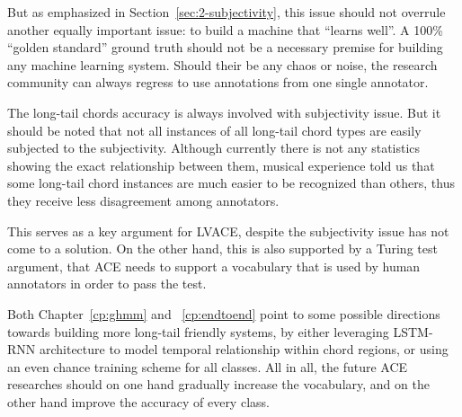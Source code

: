 But as emphasized in Section~\ref{sec:2-subjectivity}, this issue should not overrule another equally important issue: to build a machine that ``learns well''. A 100\% ``golden standard'' ground truth should not be a necessary premise for building any machine learning system. Should their be any chaos or noise, the research community can always regress to use annotations from one single annotator.

The long-tail chords accuracy is always involved with subjectivity issue. But it should be noted that not all instances of all long-tail chord types are easily subjected to the subjectivity. Although currently there is not any statistics showing the exact relationship between them, musical experience told us that some long-tail chord instances are much easier to be recognized than others, thus they receive less disagreement among annotators.

This serves as a key argument for LVACE, despite the subjectivity issue has not come to a solution. On the other hand, this is also supported by a Turing test argument, that ACE needs to support a vocabulary that is used by human annotators in order to pass the test.

Both Chapter~\ref{cp:ghmm} and ~\ref{cp:endtoend} point to some possible directions towards building more long-tail friendly systems, by either leveraging LSTM-RNN architecture to model temporal relationship within chord regions, or using an even chance training scheme for all classes. All in all, the future ACE researches should on one hand gradually increase the vocabulary, and on the other hand improve the accuracy of every class.




 






